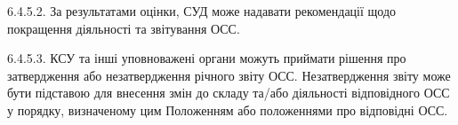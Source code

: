         6.4.5.2. За результатами оцінки, СУД може надавати рекомендації щодо покращення діяльності та звітування ОСС.
        
        6.4.5.3. КСУ та інші уповноважені органи можуть приймати рішення про затвердження або незатвердження річного звіту ОСС. Незатвердження звіту може бути підставою для внесення змін до складу та/або діяльності відповідного ОСС у порядку, визначеному цим Положенням або положеннями про відповідні ОСС.